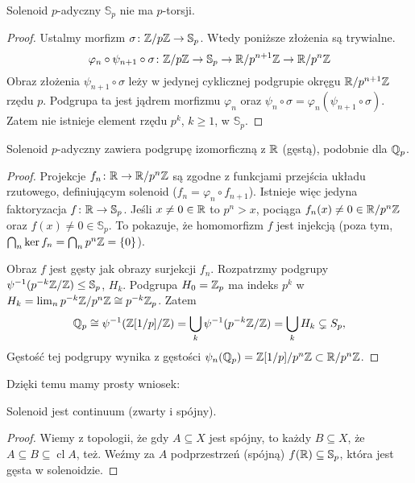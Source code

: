 \begin{fakt}
	Solenoid $p$-adyczny $\mathbb S_p$ nie ma $p$-torsji.
\end{fakt}

\begin{proof}
	Ustalmy morfizm $\sigma \colon \mathbb Z / p\mathbb Z \to \mathbb S_p$.
	Wtedy poniższe złożenia są trywialne.
	\[
		\varphi_n \circ \psi_{n+1} \circ \sigma \colon \mathbb Z/p\mathbb Z \to \mathbb S_p\to \mathbb R/p^{n+1}\mathbb Z \to \mathbb R/p^n\mathbb Z
	\]
	Obraz złożenia $\psi_{n+1} \circ \sigma$ leży w jedynej cyklicznej podgrupie okręgu $\mathbb R/p^{n+1} \mathbb Z$ rzędu $p$.
	Podgrupa ta jest jądrem morfizmu $\varphi_n$ oraz $\psi_n \circ \sigma = \varphi_n(\psi_{n+1} \circ \sigma)$.
	Zatem nie istnieje element rzędu $p^k$, $k \ge 1$, w $\mathbb S_p$.
\end{proof}

\begin{fakt}
	Solenoid  $p$-adyczny zawiera podgrupę izomorficzną z $\mathbb R$ (gęstą), podobnie dla $\mathbb Q_p$.
\end{fakt}

\begin{proof}
	Projekcje $f_n \colon \mathbb R \to \mathbb R/p^n\mathbb Z$ są zgodne z funkcjami przejścia układu rzutowego, definiującym solenoid ($f_n = \varphi_n \circ f_{n+1}$).
	Istnieje więc jedyna faktoryzacja $f \colon \mathbb R \to \mathbb S_p$.
	Jeśli $x \neq 0 \in \mathbb R$ to $p^n > x$, pociąga $f_n(x) \neq 0 \in \mathbb R/p^n\mathbb Z$ oraz $f(x) \neq 0 \in \mathbb S_p$.
	To pokazuje, że homomorfizm $f$ jest injekcją (poza tym, $\bigcap_n \ker f_n = \bigcap_n p^n\mathbb Z = \{0\}$).

	Obraz $f$ jest gęsty jak obrazy surjekcji $f_n$.
	Rozpatrzmy podgrupy $\psi^{-1}(p^{-k} \mathbb Z/\mathbb Z) \le \mathbb S_p$, $H_k$.
	Podgrupa $H_0 = \mathbb Z_p$ ma indeks $p^k$ w $H_k = \lim_n p^{-k}\mathbb Z / p^n\mathbb Z \cong p^{-k}\mathbb Z_p$.
	Zatem
	\[
		\mathbb Q_p \cong \psi^{-1}(\mathbb Z[1/p] / \mathbb Z) = \bigcup_k \psi^{-1} (p^{-k}\mathbb Z/\mathbb Z) = \bigcup_k H_k \subsetneq S_p,
	\]
	Gęstość tej podgrupy wynika z gęstości $\psi_n (\mathbb Q_p) = \mathbb Z[1/p] / p^n \mathbb Z \subset \mathbb R/p^n\mathbb Z$.
\end{proof}

Dzięki temu mamy prosty wniosek:

\begin{fakt}
	Solenoid jest continuum (zwarty i spójny).
\end{fakt}

\begin{proof}
	Wiemy z topologii, że gdy $A \subseteq X$ jest spójny, to każdy $B \subseteq X$, że $A \subseteq B \subseteq \operatorname{cl} A$, też.
	Weźmy za $A$ podprzestrzeń (spójną) $f(\mathbb R) \subseteq \mathbb S_p$, która jest gęsta w solenoidzie.
\end{proof}

